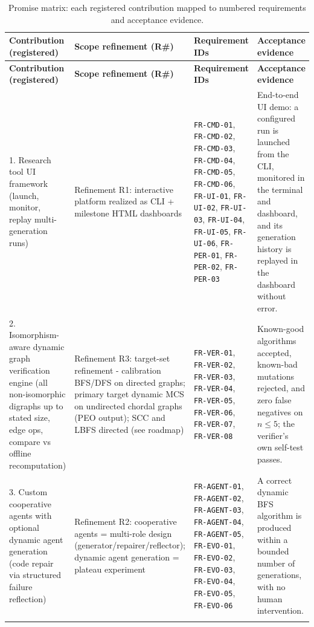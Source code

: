 \documentclass[12pt,a4paper]{article}
\begin{document}
\begin{center}
\footnotesize
\setlength{\tabcolsep}{4pt}
\renewcommand{\arraystretch}{1.25}
\begin{longtable}{@{}p{3.0cm}p{3.4cm}p{3.6cm}p{3.6cm}@{}}
\toprule
\textbf{Contribution (registered)} & \textbf{Scope refinement (R\#)} & \textbf{Requirement IDs} & \textbf{Acceptance evidence} \\
\midrule
\endfirsthead
\toprule
\textbf{Contribution (registered)} & \textbf{Scope refinement (R\#)} & \textbf{Requirement IDs} & \textbf{Acceptance evidence} \\
\midrule
\endhead
\bottomrule
\endfoot

1. Research tool UI framework (launch, monitor, replay multi-generation runs) & Refinement R1: interactive platform realized as CLI + milestone HTML dashboards & \texttt{FR-CMD-01}, \texttt{FR-CMD-02}, \texttt{FR-CMD-03}, \texttt{FR-CMD-04}, \texttt{FR-CMD-05}, \texttt{FR-CMD-06}, \texttt{FR-UI-01}, \texttt{FR-UI-02}, \texttt{FR-UI-03}, \texttt{FR-UI-04}, \texttt{FR-UI-05}, \texttt{FR-UI-06}, \texttt{FR-PER-01}, \texttt{FR-PER-02}, \texttt{FR-PER-03} & End-to-end UI demo: a configured run is launched from the CLI, monitored in the terminal and dashboard, and its generation history is replayed in the dashboard without error. \\
\addlinespace[2pt]

2. Isomorphism-aware dynamic graph verification engine (all non-isomorphic digraphs up to stated size, edge ops, compare vs offline recomputation) & Refinement R3: target-set refinement - calibration BFS/DFS on directed graphs; primary target dynamic MCS on undirected chordal graphs (PEO output); SCC and LBFS directed (see roadmap) & \texttt{FR-VER-01}, \texttt{FR-VER-02}, \texttt{FR-VER-03}, \texttt{FR-VER-04}, \texttt{FR-VER-05}, \texttt{FR-VER-06}, \texttt{FR-VER-07}, \texttt{FR-VER-08} & Known-good algorithms accepted, known-bad mutations rejected, and zero false negatives on $n \le 5$; the verifier's own self-test passes. \\
\addlinespace[2pt]

3. Custom cooperative agents with optional dynamic agent generation (code repair via structured failure reflection) & Refinement R2: cooperative agents = multi-role design (generator/repairer/reflector); dynamic agent generation = plateau experiment & \texttt{FR-AGENT-01}, \texttt{FR-AGENT-02}, \texttt{FR-AGENT-03}, \texttt{FR-AGENT-04}, \texttt{FR-AGENT-05}, \texttt{FR-EVO-01}, \texttt{FR-EVO-02}, \texttt{FR-EVO-03}, \texttt{FR-EVO-04}, \texttt{FR-EVO-05}, \texttt{FR-EVO-06} & A correct dynamic BFS algorithm is produced within a bounded number of generations, with no human intervention. \\
\bottomrule
\caption{Promise matrix: each registered contribution mapped to numbered requirements and acceptance evidence.}
\label{tab:promise}
\end{longtable}
\end{center}
\end{document}
